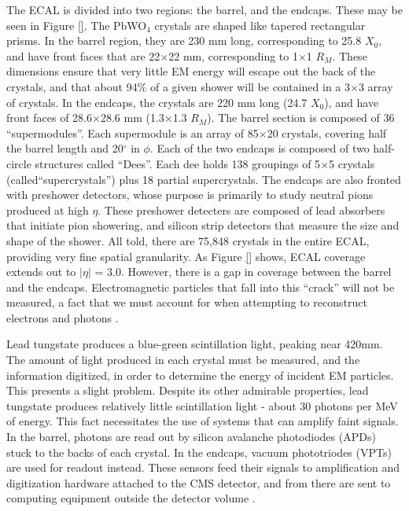 The ECAL is divided into two regions: the barrel, and the
endcaps. These may be seen in Figure \ref{}.
The PbWO$_4$ crystals are shaped like tapered rectangular prisms. In
the barrel region, they are 230 mm long, corresponding to 25.8 $X_0$,
and have front faces that are 22$\times$22 mm, corresponding to
1$\times$1 $R_M$. These dimensions ensure that very little EM energy
will escape out the back of the crystals, and that
about 94\% of a given shower will be contained in a 3$\times$3 array
of crystals. In the endcaps, the crystals are 220 mm long (24.7 $X_0$),
and have front faces of 28.6$\times$28.6 mm (1.3$\times$1.3 $R_M$).
The barrel section is composed of 36 ``supermodules''. Each
supermodule is an array of 85$\times$20 crystals, covering half the
barrel length and 20$^\circ$ in $\phi$. Each of the two endcaps is
composed of two half-circle structures called ``Dees''. Each dee holds
138 groupings of 5$\times$5 crystals (called``supercrystals'') plus
18 partial supercrystals. The endcaps are also fronted with preshower
detectors, whose purpose is primarily to study neutral pions produced
at high $\eta$. These preshower detecters are composed of lead
absorbers that initiate pion showering, and silicon strip detectors
that measure the size and shape of the shower. All told, there are
75,848 crystals in the entire ECAL, providing very fine spatial
granularity. As Figure \ref{}
shows, ECAL coverage extends out to $|\eta|$ = 3.0. However, there is
a gap in coverage between the barrel and the endcaps. Electromagnetic
particles that fall into this ``crack'' will not be measured, a fact
that we must account for when attempting to reconstruct electrons and
photons \cite{tdr}.


Lead tungstate produces a blue-green scintillation light, peaking near
420mm. The amount of light produced in each crystal must be measured,
and the information digitized, in order to determine the energy of incident EM
particles. This presents a slight problem. Despite its other admirable
properties, lead tungstate produces relatively little scintillation
light - about 30 photons per MeV of energy. This fact necessitates
the use of systems that can amplify faint signals. In the
barrel, photons are read out by silicon avalanche photodiodes (APDs)
stuck to the backs of each crystal. In the endcaps, vacuum
phototriodes (VPTs) are used for readout instead. These sensors feed
their signals to amplification and digitization hardware attached to
the CMS detector, and from there are sent to computing equipment
outside the detector volume \cite{tdr}.

